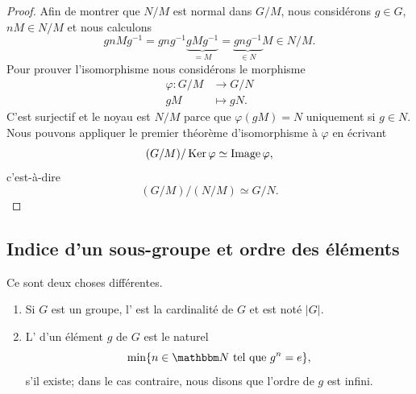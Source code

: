 \begin{proof}
    Afin de montrer que \( N/M\) est normal dans \( G/M\), nous considérons \( g\in G\), \( nM\in N/M\) et nous calculons
    \begin{equation}
        gnMg^{-1}=gng^{-1}\underbrace{gMg^{-1}}_{=M}=\underbrace{gng^{-1}}_{\in N}M\in N/M.
    \end{equation}
    Pour prouver l'isomorphisme nous considérons le morphisme
    \begin{equation}
        \begin{aligned}
            \varphi\colon G/M&\to G/N \\
            gM&\mapsto gN.
        \end{aligned}
    \end{equation}
    C'est surjectif et le noyau est \( N/M\) parce que \( \varphi(gM)=N\) uniquement si \( g\in N\). Nous pouvons appliquer le premier théorème d'isomorphisme à \( \varphi\) en écrivant
    \begin{equation}
        (G/M)/\operatorname{Ker} \varphi\simeq\operatorname{Image} \varphi,
    \end{equation}
    c'est-à-dire
    \begin{equation}
        (G/M)/(N/M)\simeq G/N.
    \end{equation}
\end{proof}

\subsection{Indice d'un sous-groupe et ordre des éléments}
\begin{definition}       \label{DEFooKWBCooMlmpCP}
    Ce sont deux choses différentes.
    \begin{enumerate}
        \item

    Si \( G\) est un groupe, l' est la cardinalité de \( G\) et est noté \( | G |\).
\item

    L' d'un élément \( g\) de \( G\) est le naturel
    \begin{equation}
        \min\{ n\in\eN\tq g^n=e \},
    \end{equation}
    s'il existe; dans le cas contraire, nous disons que l'ordre de \( g\) est infini.
    \end{enumerate}
\end{definition}

